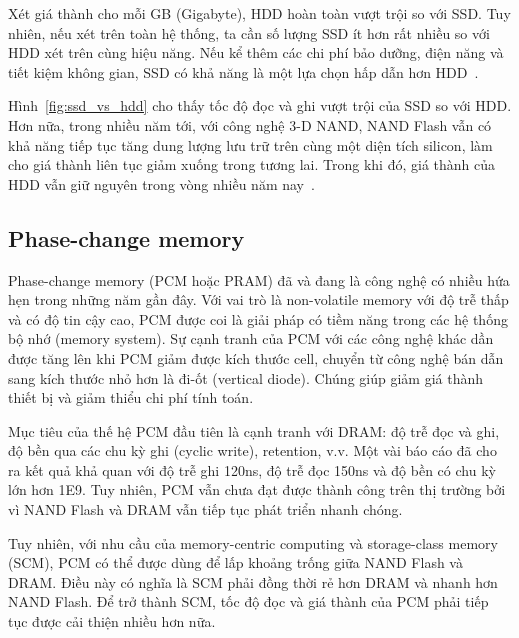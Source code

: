 Xét giá thành cho mỗi GB (Gigabyte), HDD hoàn toàn vượt trội so với SSD. Tuy
nhiên, nếu xét trên toàn hệ thống, ta cần số lượng SSD ít hơn rất nhiều so với
HDD xét trên cùng hiệu năng. Nếu kể thêm các chi phí bảo dưỡng, điện năng
và tiết kiệm không gian, SSD có khả năng là một lựa chọn hấp dẫn hơn
HDD~\cite{wongMarketApplicationsNAND2010}.

Hình~\ref{fig:ssd_vs_hdd} cho thấy tốc độ đọc và ghi vượt trội của SSD so với
HDD. Hơn nữa, trong nhiều năm tới, với công nghệ 3-D NAND, NAND Flash vẫn có khả
năng tiếp tục tăng dung lượng lưu trữ trên cùng một diện tích silicon, làm cho
giá thành liên tục giảm xuống trong tương lai. Trong khi đó, giá thành của HDD
vẫn giữ nguyên trong vòng nhiều năm
nay~\cite{monziocompagnoniReviewingEvolutionNAND2017}.



\subsection{Phase-change memory}
Phase-change memory (PCM hoặc PRAM) đã và đang là công nghệ có nhiều hứa hẹn
trong những năm gần đây. Với vai trò là non-volatile memory với độ trễ thấp và
có độ tin cậy cao, PCM được coi là giải pháp có tiềm năng trong các hệ thống bộ
nhớ (memory system). Sự cạnh tranh của PCM với các công nghệ khác dần được tăng
lên khi PCM giảm được kích thước cell, chuyển từ công nghệ bán dẫn sang kích
thước nhỏ hơn là đi-ốt (vertical diode). Chúng giúp giảm giá thành thiết bị và
giảm thiểu chi phí tính toán.

Mục tiêu của thế hệ PCM đầu tiên là cạnh tranh với DRAM: độ trễ đọc và ghi, độ
bền qua các chu kỳ ghi (cyclic write), retention, v.v. Một vài báo cáo đã cho
ra kết quả khả quan với độ trễ ghi 120ns, độ trễ đọc 150ns và độ bền có chu kỳ
lớn hơn 1E9. Tuy nhiên, PCM vẫn chưa đạt được thành công trên thị trường bởi vì
NAND Flash và DRAM vẫn tiếp tục phát triển nhanh chóng.

Tuy nhiên, với nhu cầu của memory-centric computing và storage-class memory
(SCM), PCM có thể được dùng để lấp khoảng trống giữa NAND Flash và DRAM. Điều
này có nghĩa là SCM phải đồng thời rẻ hơn DRAM và nhanh hơn NAND Flash. Để trở
thành SCM, tốc độ đọc và giá thành của PCM phải tiếp tục được cải thiện nhiều
hơn nữa.

